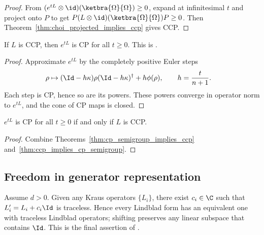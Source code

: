 \begin{proof}
    \leanok
    From $(e^{tL}\otimes\id)(\ketbra{\Omega}{\Omega}) \ge 0$,
    expand at infinitesimal $t$ and project onto $P$ to get
    $P(L\otimes\id)(\ketbra{\Omega}{\Omega})P \ge 0$.
    Then Theorem~\ref{thm:choi_projected_implies_ccp} gives CCP.
\end{proof}

\begin{theorem}
    \label{thm:ccp_implies_cp_semigroup}
    \leanok
    If $L$ is CCP, then $e^{tL}$ is CP for all $t \ge 0$.
    This is \cite[Proposition~7.3]{Wolf2012Quantum}.
\end{theorem}

\begin{proof}
    \leanok
    Approximate $e^{tL}$ by the completely positive Euler steps
    \begin{align}
        \rho
        &\mapsto (\Id-h\kappa)\rho(\Id-h\kappa)^\dagger+h\phi(\rho),
        \qquad h=\frac{t}{n+1}.
        \notag
    \end{align}
    Each step is CP, hence so are its powers. These powers converge in operator
    norm to $e^{tL}$, and the cone of CP maps is closed.
\end{proof}

\begin{theorem}
    \label{thm:cp_semigroup_iff_ccp}
    \leanok
    $e^{tL}$ is CP for all $t \ge 0$ if and only if $L$ is CCP.
\end{theorem}

\begin{proof}
    \leanok
    Combine Theorems~\ref{thm:cp_semigroup_implies_ccp}
    and~\ref{thm:ccp_implies_cp_semigroup}.
\end{proof}

\subsection{Freedom in generator representation}

\begin{theorem}
    \label{thm:exists_traceless_kraus_shift}
    \leanok
    Assume $d > 0$. Given any Kraus operators $\{L_i\}$, there exist
    $c_i \in \C$ such that $L_i' = L_i+c_i\Id$ is traceless.
    Hence every Lindblad form has an equivalent one with traceless Lindblad
    operators; shifting preserves any linear subspace that contains $\Id$.
    This is the final assertion of \cite[Proposition~7.4(1)]{Wolf2012Quantum}.
\end{theorem}

